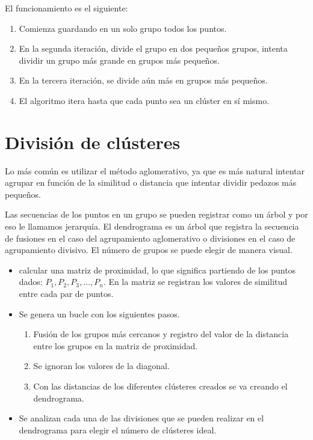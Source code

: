 El funcionamiento es el siguiente:

\begin{enumerate}
    \item Comienza guardando en un solo grupo todos los puntos.
    \item En la segunda iteración, divide el grupo en dos pequeños grupos, intenta dividir un grupo más grande en grupos más pequeños.
    \item En la tercera iteración, se divide aún más en grupos más pequeños.
    \item El algoritmo itera hasta que cada punto sea un clúster en sí mismo.
    
\end{enumerate}

\section{División de clústeres}
Lo más común es utilizar el método aglomerativo, ya que es más natural intentar agrupar en función de la similitud o distancia que intentar dividir pedazos más pequeños.

 Las secuencias de los puntos en un grupo se pueden registrar como un árbol y por eso le llamamos jerarquía. El dendrograma es un árbol que registra la secuencia de fusiones en el caso del agrupamiento aglomerativo o divisiones en el caso de agrupamiento divisivo. El número de grupos se puede elegir de manera visual.

 \begin{itemize}
     \item  calcular una matriz de proximidad, lo que significa partiendo de los puntos dados: 
     $P_1,P_2,P_3,\dots,P_n$. En la matriz se registran los valores de similitud entre cada par de puntos.
     \item Se genera un bucle con los siguientes pasos.
     \begin{enumerate}
         \item Fusión de los grupos más cercanos y registro del valor de la distancia entre los grupos en la matriz de proximidad.
         \item Se ignoran los valores de la diagonal.
         \item  Con las distancias de los diferentes clústeres creados se va creando el dendrograma.
     \end{enumerate}
     \item  Se analizan cada una de las divisiones que se pueden realizar en el dendrograma para elegir el número de clústeres ideal.
     
 \end{itemize}

